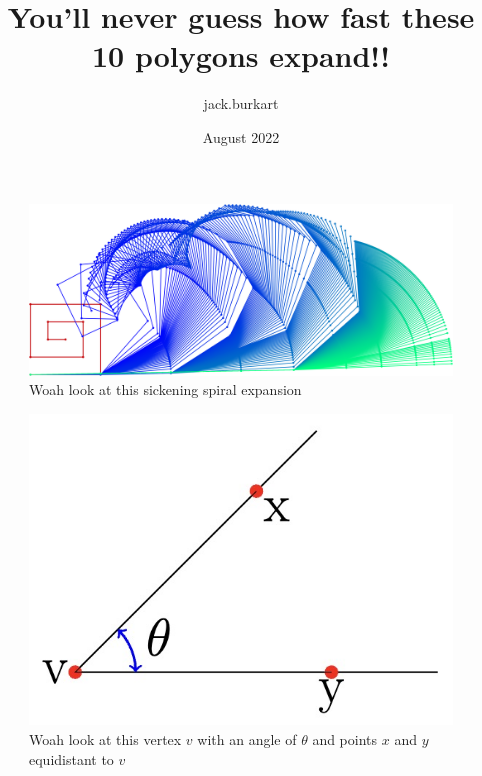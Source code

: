 \documentclass{article}
\title{You'll never guess how fast these 10 polygons expand!!}
\author{jack.burkart }
\date{August 2022}
\begin{document}
\maketitle


\begin{figure}[ht!]
    \centering
    \includegraphics[width=\textwidth]{figures/spiral_fourth.png}
    \caption{Woah look at this sickening spiral expansion}
    \label{fig:spiral_fourth_expand}
\end{figure}


\begin{figure}
    \centering
    \includegraphics[width=\textwidth]{figures/adj ca.jpg}
    \caption{Woah look at this vertex $v$ with an angle of $\theta$ and points $x$ and $y$ equidistant to $v$}
    \label{fig:my_label}
\end{figure}
    
\end{document}
